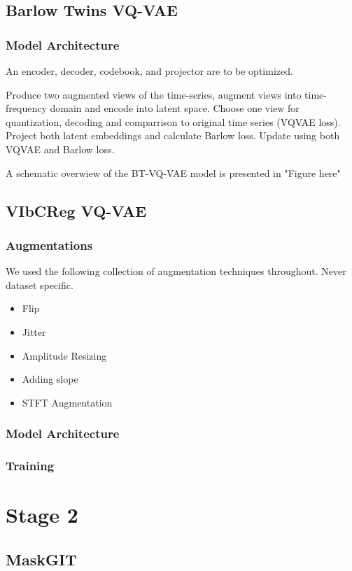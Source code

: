 \documentclass[../../thesis.tex]{subfiles}
\begin{document}
\subsection{Barlow Twins VQ-VAE}
\subsubsection{Model Architecture}


An encoder, decoder, codebook, and projector are to be optimized.

Produce two augmented views of the time-series, augment views into time-frequency domain and encode into latent space. Choose one view for quantization, decoding and comparrison to original time series (VQVAE loss). Project both latent embeddings and calculate Barlow loss. Update using both VQVAE and Barlow loss.

A schematic overwiew of the BT-VQ-VAE model is presented in "Figure here"

\subsection{VIbCReg VQ-VAE}

\subsubsection{Augmentations}
We used the following collection of augmentation techniques throughout. Never dataset specific.
\begin{itemize}
    \item Flip
    \item Jitter
    \item Amplitude Resizing
    \item Adding slope
    \item STFT Augmentation
\end{itemize}

\subsubsection{Model Architecture}

\subsubsection{Training}

\section{Stage 2}

\subsection{MaskGIT}
\end{document}
